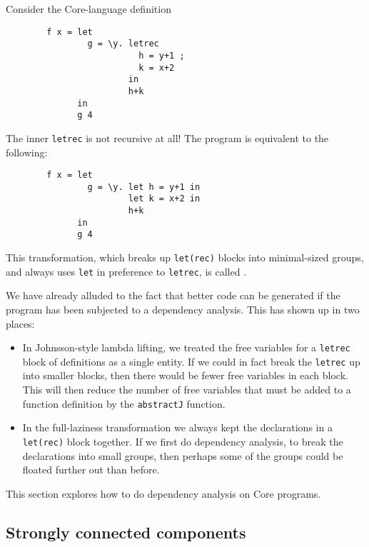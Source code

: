 Consider the Core-language definition
\begin{verbatim}
        f x = let
                g = \y. letrec
                          h = y+1 ;
                          k = x+2
                        in
                        h+k
              in
              g 4
\end{verbatim}
The inner \mbox{\tt letrec} is not recursive at all!  The program is equivalent to
the following:
\begin{verbatim}
        f x = let
                g = \y. let h = y+1 in
                        let k = x+2 in
                        h+k
              in
              g 4
\end{verbatim}
This transformation, which breaks up \mbox{\tt let(rec)} blocks into
minimal-sized groups, and always uses \mbox{\tt let} in preference to \mbox{\tt letrec},
is called .

We have already alluded to the fact that better code can be generated
if the program has been subjected to a dependency analysis.
This has shown up in two places:
\begin{itemize}
\item
In Johnsson-style lambda lifting, we treated the free variables for a
\mbox{\tt letrec} block of definitions as a single entity. If we could in fact break
the \mbox{\tt letrec} up into smaller blocks, then there would be fewer free
variables in each block. This will then reduce the number of free
variables that must be added to a function definition by the
\mbox{\tt abstractJ} function.
\item
In the full-laziness transformation we always kept the declarations in
a \mbox{\tt let(rec)} block together. If we first do dependency analysis, to break the
declarations into small groups, then perhaps some of the groups could
be floated further out than before.
\end{itemize}
This section explores how to do dependency analysis on Core programs.

\subsection{Strongly connected components}
\label{ll:SCCs}

